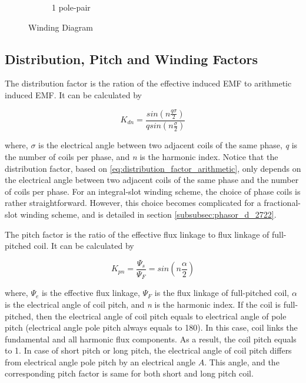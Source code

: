 \documentclass[a4paper, 11pt]{article}
\begin{document}
\begin{figure}[h!]
\begin{subfigure}[b]{0.35\textwidth}
        \vspace{20pt}
        \caption{1 pole-pair}
        \label{subfig:winding_1pole_dolomites}
    \end{subfigure}
    \caption{Winding Diagram}
    \label{fig:windingDiagram_dolomites}
\end{figure}


\subsection{Distribution, Pitch and Winding Factors}

The distribution factor is the ration of the effective induced EMF to arithmetic induced EMF. It can be calculated by

\begin{equation}
K_{dn} = \frac{sin(n\frac{q\sigma}{2})}{qsin(n\frac{\sigma}{2})}
\label{eq:distribution_factor_arithmetic}
\end{equation}

where, \textit{$\sigma$} is the electrical angle between two adjacent coils of the same phase, \textit{q} is the number of coils per phase, and \textit{n} is the harmonic index. Notice that the distribution factor, based on \ref{eq:distribution_factor_arithmetic}, only depends on the electrical angle between two adjacent coils of the same phase and the number of coils per phase. For an integral-slot winding scheme, the choice of phase coils is rather straightforward. However, this choice becomes complicated for a fractional-slot winding scheme, and is detailed in section \ref{subsubsec:phasor_d_2722}.

The pitch factor is the ratio of the effective flux linkage to flux linkage of full-pitched coil. It can be calculated by

\begin{equation}
K_{pn} = \frac{\Psi_s}{\Psi_F}=sin(n\frac{\alpha}{2})
\label{eq:pitch_factor_artihmetic}
\end{equation}

where, \textit{$\Psi_e$} is the effective flux linkage, \textit{$\Psi_F$} is the flux linkage of full-pitched coil, $\alpha$ is the electrical angle of coil pitch, and \textit{n} is the harmonic index. If the coil is full-pitched, then the electrical angle of coil pitch equals to electrical angle of pole pitch (electrical angle pole pitch always equals to 180\degree). In this case, coil links the fundamental and all harmonic flux components. As a result, the coil pitch equals to 1. In case of short pitch or long pitch, the electrical angle of coil pitch differs from electrical angle pole pitch by an electrical angle $A$. This angle, and the corresponding pitch factor is same for both short and long pitch coil.
\end{document}
